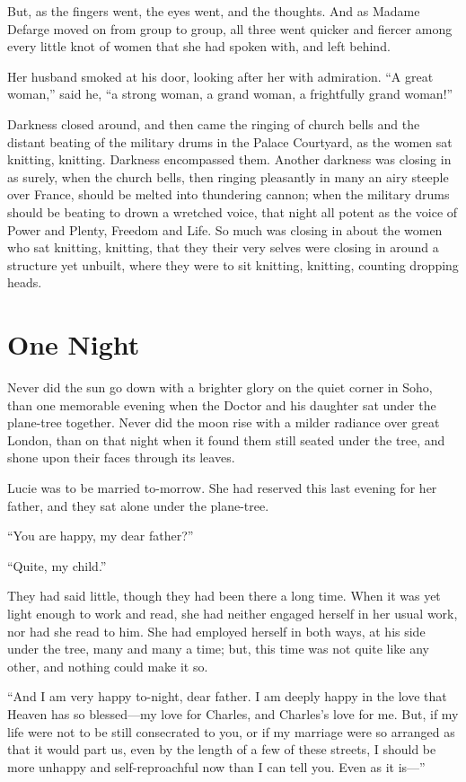 But, as the fingers went, the eyes went, and the thoughts.  And as
Madame Defarge moved on from group to group, all three went quicker
and fiercer among every little knot of women that she had spoken with,
and left behind.

Her husband smoked at his door, looking after her with admiration.
``A great woman,'' said he, ``a strong woman, a grand woman, a frightfully
grand woman!''

Darkness closed around, and then came the ringing of church bells and
the distant beating of the military drums in the Palace Courtyard, as
the women sat knitting, knitting.  Darkness encompassed them.  Another
darkness was closing in as surely, when the church bells, then ringing
pleasantly in many an airy steeple over France, should be melted into
thundering cannon; when the military drums should be beating to drown
a wretched voice, that night all potent as the voice of Power and
Plenty, Freedom and Life.  So much was closing in about the women
who sat knitting, knitting, that they their very selves were closing
in around a structure yet unbuilt, where they were to sit knitting,
knitting, counting dropping heads.



\chapter{One Night}


Never did the sun go down with a brighter glory on the quiet corner
in Soho, than one memorable evening when the Doctor and his daughter
sat under the plane-tree together.  Never did the moon rise with a
milder radiance over great London, than on that night when it found
them still seated under the tree, and shone upon their faces
through its leaves.

Lucie was to be married to-morrow.  She had reserved this last
evening for her father, and they sat alone under the plane-tree.

``You are happy, my dear father?''

``Quite, my child.''

They had said little, though they had been there a long time.  When
it was yet light enough to work and read, she had neither engaged
herself in her usual work, nor had she read to him.  She had employed
herself in both ways, at his side under the tree, many and many a time;
but, this time was not quite like any other, and nothing could make it so.

``And I am very happy to-night, dear father.  I am deeply happy in the
love that Heaven has so blessed---my love for Charles, and Charles's
love for me.  But, if my life were not to be still consecrated to you,
or if my marriage were so arranged as that it would part us, even by
the length of a few of these streets, I should be more unhappy and
self-reproachful now than I can tell you.  Even as it is---''

